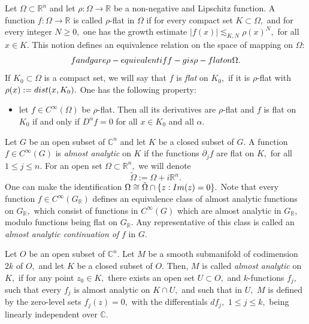\documentclass[12pt, reqno]{amsart}
\theoremstyle{definition}
\theoremstyle{remark}
\numberwithin{equation}{section}
\begin{document}
Let $\Omega\subset \mathbb{R}^n$ and let $\rho:\Omega\rightarrow \mathbb{R}$ be a non-negative and Lipschitz function. A function $f:\Omega\rightarrow \mathbb{R}$ is called $\rho$-flat in $\Omega$ if for every compact set $K\subset \Omega,$ and for every integer $N\geq 0,$ one has the growth estimate $|f(x)|\lesssim_{K,N} \rho(x)^{N},$ for all $x\in K.$ This notion defines an equivalence relation on the space of mapping on $\Omega:$
$$f\textnormal{ and }g \textnormal{ are }\rho\textnormal{-equivalent if }f-g\textnormal{ is }\rho\textnormal{-flat on }\Omega. $$ If $K_0\subset \Omega$ is a compact set, we will say that $f$ is {\it flat } on $K_0,$ if it is $\rho$-flat with $\rho(x):=\textnormal{dist}(x,K_0).$ One has the following property:
\begin{itemize}
    \item let $f\in C^{\infty}(\Omega)$ be $\rho$-flat. Then all its derivatives are $\rho$-flat and $f$ is flat on $K_0$ if and only if $D^{\alpha}f=0$ for all $x\in K_0$ and all $\alpha.$ 
\end{itemize}
Let $G$ be an open subset of $\mathbb{C}^n$ and let $K$ be a closed subset of $G.$ A  function $f\in C^\infty(G)$ is {\it almost analytic} on $K$ if the functions $\partial_j f$ are flat on $K,$ for all $1\leq j\leq n.$ For an open set  $\Omega\subset \mathbb{R}^n,$ we will denote
\begin{equation}
   \tilde{\Omega}:=\Omega+i\mathbb{R}^n.
\end{equation}One can make the identification $\Omega\cong \tilde{\Omega}\cap\{z:\textnormal{Im}(z)=0 \}.$ Note that
every function $f\in C^{\infty}(G_{\mathbb{R}})$ defines an equivalence class of almost analytic functions on $G_\mathbb{R},$ which consist of functions in $C^\infty(G)$ which are almost analytic in $G_\mathbb{R},$ modulo functions being flat on $G_{\mathbb{R}}.$ Any representative of this class is called an {\it almost analytic continuation of }$f$ in $G.$

Let $O$ be an open subset of $\mathbb{C}^n.$ Let $M$ be a smooth submanifold of codimension $2k$ of $O,$ and let $K$ be a closed subset of $O.$ Then, $M$ is called {\it almost analytic }on $K,$ if for any point $z_0\in K,$ there exists an open set $U\subset O,$ and $k$-functions $f_{j},$ such that every $f_j$ is almost analytic on $K\cap U,$
and such that in $U,$ $M$ is defined by the zero-level sets $f_j(z)=0,$ with the differentials $df_{j},$ $1\leq j\leq k,$ being linearly independent over $\mathbb{C}.$
\end{document}
